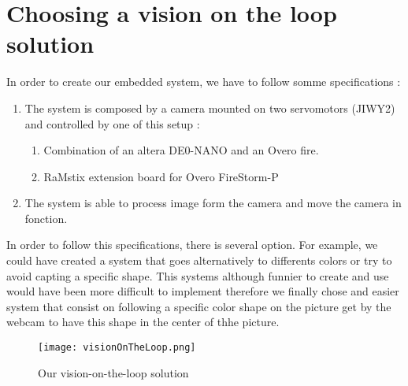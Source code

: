\section{Choosing a vision on the loop solution}

In order to create our embedded system, we have to follow somme specifications : 

\begin{enumerate}
 \item The system is composed by a camera mounted on two servomotors (JIWY2) and controlled by one of this setup :
 \begin{enumerate}
  \item Combination of an altera DE0-NANO and an Overo fire.
  \item RaMstix extension board for Overo FireStorm-P
 \end{enumerate}
 \item The system is able to process image form the camera and move the camera in fonction.
\end{enumerate}

In order to follow this specifications, there is several option. For example, we could have created a system that goes alternatively to differents colors or try to avoid capting a specific shape. This systems although funnier to create and use would have been more difficult to implement therefore we finally chose and easier system that consist on following a specific color shape on the picture get by the webcam to have this shape in the center of thhe picture.

\begin{figure}[!ht]
\centering
 \texttt{[image: visionOnTheLoop.png]}
 \caption{Our vision-on-the-loop solution}
 \label{votl}
\end{figure}


